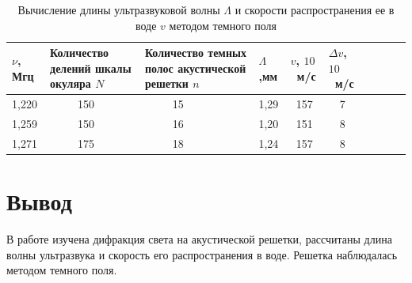 \documentclass[journal, a4paper]{IEEEtran}
\begin{document}
\begin{table}[h!]
	\centering
\begin{tabular}{|p{0.7cm}|p{2cm}|p{2cm}|p{0.7cm}|p{0.83cm}|p{0.83cm}|c|c|c|c|}
\hline
 \vspace{0.22cm} \hspace{5pt}$\nu$\hspace{2pt}, Мгц& Количество делений шкалы окуляра $N$&Количество темных полос акустической решетки $n$&\vspace{0.25cm} \hspace{2pt}$\Lambda$,мм&\vspace{0.25cm} \hspace{10pt}$v$, $10$~м/с&\vspace{0.21cm} \hspace{5pt}$\Delta v$, $10$~м/с\\
\hline
1,220&~~~~~150&~~~~~15&1,29&~157&~~7\\
\hline
1,259&~~~~~150&~~~~~16&1,20&~151&~~8\\
\hline
1,271&~~~~~175&~~~~~18&1,24&~157&~~8\\
\hline
\end{tabular}
	\caption{Вычисление длины ультразвуковой волны $ \Lambda $ и скорости распространения ее в воде $ v $ методом темного поля}
	\label{dark}
\end{table}
\section{Вывод}

В работе изучена дифракция света на акустической решетки, рассчитаны длина волны ультразвука и скорость его распространения в воде. Решетка наблюдалась методом
темного поля.



\end{document}
